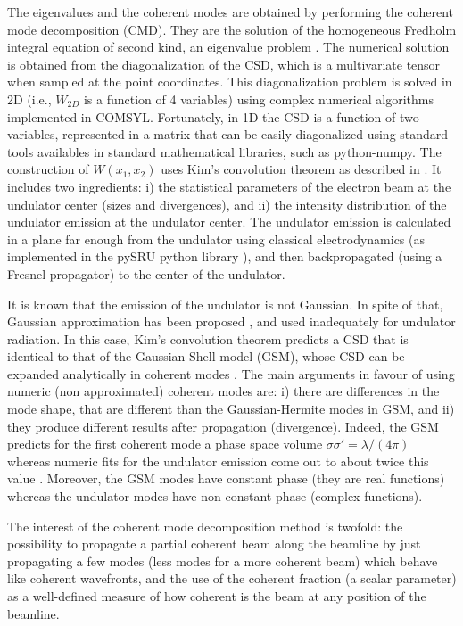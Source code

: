 \documentclass{iucr}              %
\begin{document}
The eigenvalues and the coherent modes are obtained by performing the coherent mode decomposition (CMD). They are the solution of the homogeneous Fredholm integral equation of second kind, an eigenvalue problem \cite{glass2017}. The numerical solution is obtained from the diagonalization of the CSD, which is a multivariate tensor when sampled at the point coordinates. This diagonalization problem is solved in 2D (i.e., $W_{2D}$ is a function of 4 variables) using complex numerical algorithms implemented in COMSYL. Fortunately, in 1D the CSD is a function of two variables, represented in a matrix that can be easily diagonalized using standard tools availables in standard mathematical libraries, such as python-numpy. The construction of $W(x_1,x_2)$ uses Kim's convolution theorem \cite{kim1986b} as described in . It includes two ingredients: i) the statistical parameters of the electron beam at the undulator center (sizes and divergences), and ii) the intensity distribution of the undulator emission at the undulator center. The undulator emission is calculated in a plane far enough from the undulator using classical electrodynamics \cite{jackson} (as implemented in the pySRU python library \cite{pySRU}), and then backpropagated (using a Fresnel propagator) to the center of the undulator. 

It is known that the emission of the undulator is not Gaussian. In spite of that, Gaussian approximation has been proposed \cite{coisson1997}, and used inadequately for undulator radiation. In this case, Kim's convolution theorem predicts a CSD that is identical to that of the Gaussian Shell-model (GSM), whose CSD can be expanded analytically in coherent modes \cite{Starikov82}. The main arguments in favour of using numeric (non approximated) coherent modes are: i) there are differences in the mode shape, that are different than the Gaussian-Hermite modes in GSM, and ii) they produce different results after propagation (divergence). Indeed, the GSM predicts for the first coherent mode a phase space volume $\sigma \sigma'=\lambda/(4 \pi)$ whereas numeric fits for the undulator emission come out to about twice this value \cite{elleaume}. Moreover, the GSM modes have constant phase (they are real functions) whereas the undulator modes have non-constant phase (complex functions).

The interest of the coherent mode decomposition method is twofold: the possibility to propagate a partial coherent beam along the beamline by just propagating a few modes (less modes for a more coherent beam) which behave like coherent wavefronts, and the use of the coherent fraction (a scalar parameter) as a well-defined measure of how coherent is the beam at any position of the beamline.
\end{document}

